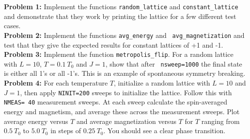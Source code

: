 \documentclass[12pt]{article}
\begin{document}
\noindent
{\bf Problem 1:} Implement the functions {\tt random\_lattice} and
{\tt constant\_lattice} and demonstrate that they work by printing the
lattice for a few different test cases.\\[4pt]

\noindent
{\bf Problem 2:} Implement the functions {\tt avg\_energy} and {\tt
  avg\_magnetization} and test that they give the expected results
for constant lattices of +1 and -1.\\[4pt]

\noindent
{\bf Problem 3:} Implement the function {\tt metropolis\_flip}.  For a
random lattice with $L=10$, $T=0.1~T_0$ and $J=1$, show that after {\tt
  nsweep=1000} the final state is either all 1's or all -1's.  This is
an example of spontaneous symmetry breaking.\\[4pt]

\noindent
{\bf Problem 4:} For each temperature $T$, initialize a random lattice
with $L=10$ and $J=1$, then apply {\tt NINIT=200} sweeps to initialize
the lattice.  Follow this with {\tt NMEAS= 40} measurement sweeps.  At
each sweep calculate the spin-averaged energy and magnetism, and
average these across the measurement sweeps.  Plot average energy
versus $T$ and average magnetization versus $T$ for $T$ ranging from
$0.5~T_0$ to $5.0~T_0$ in steps of $0.25~T_0$.  You should see a clear
phase transition.\\[4pt]
\end{document}
